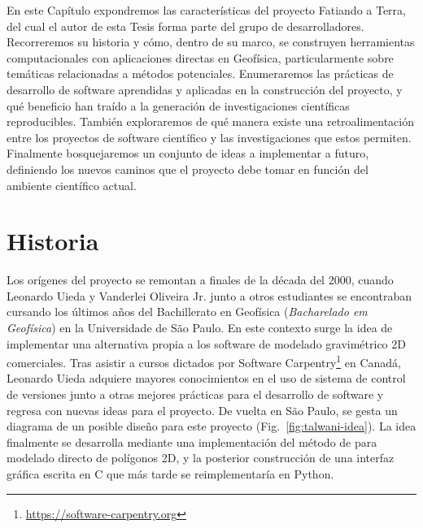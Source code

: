 En este Capítulo expondremos las  características del proyecto
Fatiando a Terra, del cual el autor de esta Tesis forma parte del grupo de
desarrolladores.
Recorreremos su historia y cómo, dentro de su marco, se construyen herramientas
computacionales con aplicaciones directas en Geofísica, particularmente sobre
temáticas relacionadas a métodos potenciales.
Enumeraremos las prácticas de desarrollo de software aprendidas y aplicadas en
la construcción del proyecto, y qué beneficio han traído a la generación de
investigaciones científicas reproducibles.
También exploraremos de qué manera existe una retroalimentación entre los
proyectos de software científico y las investigaciones que estos permiten.
Finalmente bosquejaremos un conjunto de ideas a implementar a futuro,
definiendo los nuevos caminos que el proyecto debe tomar en función del
ambiente científico actual.


\section{Historia}
\label{sec:fatiando-history}

Los orígenes del proyecto se remontan a finales de la década del 2000, cuando
Leonardo Uieda y Vanderlei Oliveira Jr. junto a otros estudiantes se
encontraban cursando los últimos años del Bachillerato en Geofísica
(\emph{Bacharelado em Geofísica}) en la Universidade de São Paulo.
En este contexto surge la idea de implementar una alternativa propia a los
software de modelado gravimétrico 2D comerciales.
Tras asistir a cursos dictados por
Software Carpentry\footnote{%
    \url{https://software-carpentry.org}
}
en Canadá, Leonardo Uieda adquiere mayores conocimientos en el uso de sistema
de control de versiones junto a otras mejores prácticas para el desarrollo de
software y regresa con nuevas ideas para el proyecto.
De vuelta en São Paulo, se gesta un diagrama de un posible diseño para este
proyecto (Fig.~\ref{fig:talwani-idea}).
La idea finalmente se desarrolla mediante una implementación del método de
\citet{talwani1959} para modelado directo de polígonos 2D, y la posterior
construcción de una interfaz gráfica escrita en C que más tarde se
reimplementaría en Python.

